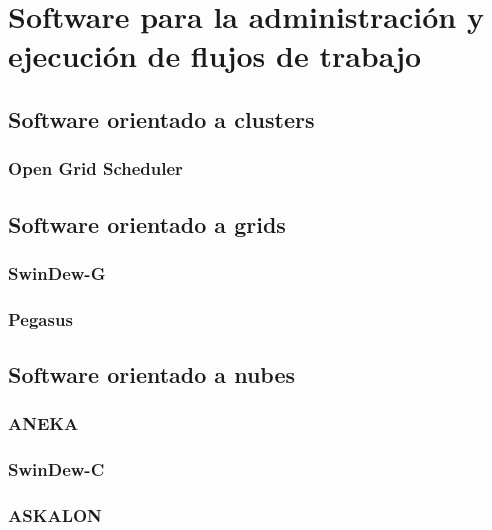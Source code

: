 \chapter{Software para la administración y ejecución de flujos de trabajo}

\section{Software orientado a clusters}

\subsection{Open Grid Scheduler}

\section{Software orientado a grids}

\subsection{SwinDew-G}

\subsection{Pegasus}

\section{Software orientado a nubes}

\subsection{ANEKA}

\subsection{SwinDew-C}

\subsection{ASKALON}
